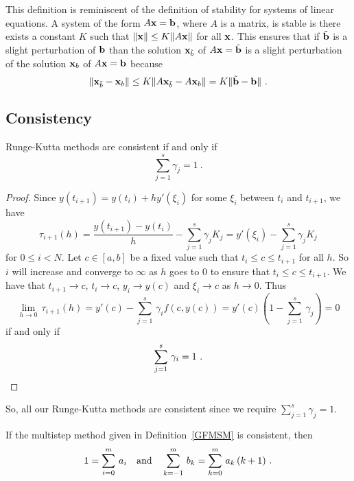 \begin{rmk}
This definition is reminiscent of the definition of stability for
systems of linear equations.  A system of the form $A \mathbf{x} = \mathbf{b}$,
where $A$ is a \nn matrix, is stable is there exists a constant $K$ such
that $\|\mathbf{x} \| \leq K \|A \mathbf{x}\|$ for all $\mathbf{x}$.  This ensures
that if $\tilde{\mathbf{b}}$ is a slight perturbation of $\mathbf{b}$ than
the solution $\mathbf{x}_{\tilde{b}}$ of $A \mathbf{x} = \tilde{\mathbf{b}}$ is a slight
perturbation of the solution $\mathbf{x}_b$ of $A \mathbf{x} = \mathbf{b}$ because
\[
\|\mathbf{x}_{\tilde{b}} - \mathbf{x}_b \|
\leq K \|A\mathbf{x}_{\tilde{b}} - A \mathbf{x}_b \|
= K \|\tilde{\mathbf{b}}- \mathbf{b} \| \ .
\]
\end{rmk}

\subsection{Consistency}

\begin{prop}
Runge-Kutta methods are consistent if and only if
\[
\sum_{j=1}^s \gamma_j = 1 \ .
\]
\end{prop}

\begin{proof}
Since $y(t_{i+1}) = y(t_i) + h y'(\xi_i)$  for some
$\xi_i$ between $t_i$ and $t_{i+1}$, we have
\[
\tau_{i+1}(h) = \frac{y(t_{i+1}) - y(t_i)}{h} - \sum_{j=1}^s \gamma_j K_j
= y'(\xi_i) - \sum_{j=1}^s \gamma_j K_j
\]
for $0 \leq i < N$.  Let $c \in [a,b]$ be a fixed value such that
$t_i \leq c \leq t_{i+1}$ for all $h$.  So $i$ will increase and
converge to $\infty$ as $h$ goes to $0$ to ensure that
$t_i \leq c \leq t_{i+1}$.  We have that
$t_{i+1} \rightarrow c$, $t_i \rightarrow c$, $y_i \to y(c)$ and 
$\xi_i \rightarrow c$ as $h \rightarrow 0$.  Thus
\[
\lim_{h\rightarrow 0}\,\tau_{i+1}(h) = y'(c) -
\sum_{j=1}^s\,\gamma_i f(c,y(c))
= y'(c) \left( 1 - \sum_{j=1}^s\,\gamma_j \right) = 0
\]
if and only if
\[
\sum_{j=1}^s \,\gamma_i = 1 \ .  \qedhere
\]
\end{proof}

So, all our Runge-Kutta methods are consistent since we require
$\displaystyle \sum_{j=1}^s \gamma_j = 1$.

\begin{prop} \label{cond_consistency}
If the multistep method given in Definition~\ref{GFMSM} is consistent,
then
\[
1 = \sum_{i=0}^m\,a_i \\
\quad\text{and} \quad
\sum_{k=-1}^m \,b_k = \sum_{k=0}^m\,a_k\,(k+1) \ .
\]
\end{prop}

